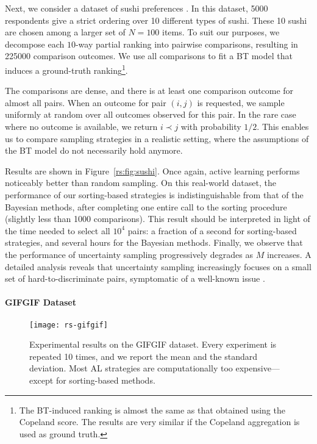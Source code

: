 Next, we consider a dataset of sushi preferences \citep{kamishima2009efficient}.
In this dataset, \num{5000} respondents give a strict ordering over \num{10} different types of sushi.
These \num{10} sushi are chosen among a larger set of $N = \num{100}$ items.
To suit our purposes, we decompose each $10$-way partial ranking into pairwise comparisons, resulting in \num{225000} comparison outcomes.
We use all comparisons to fit a BT model that induces a ground-truth ranking\footnote{
The BT-induced ranking is almost the same as that obtained using the Copeland score.
The results are very similar if the Copeland aggregation is used as ground truth.}.

The comparisons are dense, and there is at least one comparison outcome for almost all pairs.
When an outcome for pair $(i,j)$ is requested, we sample uniformly at random over all outcomes observed for this pair.
In the rare case where no outcome is available, we return $i \prec j$ with probability $1/2$.
This enables us to compare sampling strategies in a realistic setting, where the assumptions of the BT model do not necessarily hold anymore.

Results are shown in Figure~\ref{rs:fig:sushi}.
Once again, active learning performs noticeably better than random sampling.
On this real-world dataset, the performance of our sorting-based strategies is indistinguishable from that of the Bayesian methods, after completing one entire call to the sorting procedure (slightly less than \num{1000} comparisons).
This result should be interpreted in light of the time needed to select all $10^4$ pairs: a fraction of a second for sorting-based strategies, and several hours for the Bayesian methods.
Finally, we observe that the performance of uncertainty sampling progressively degrades as $M$ increases.
A detailed analysis reveals that uncertainty sampling increasingly focuses on a small set of hard-to-discriminate pairs, symptomatic of a well-known issue \citep{settles2012active}.


\paragraph{GIFGIF Dataset}

\begin{figure}
\centering
\texttt{[image: rs-gifgif]}
\caption{
Experimental results on the GIFGIF dataset.
Every experiment is repeated \num{10} times, and we report the mean and the standard deviation.
Most AL strategies are computationally too expensive---except for sorting-based methods.
}
\label{rs:fig:gifgif}
\end{figure}

